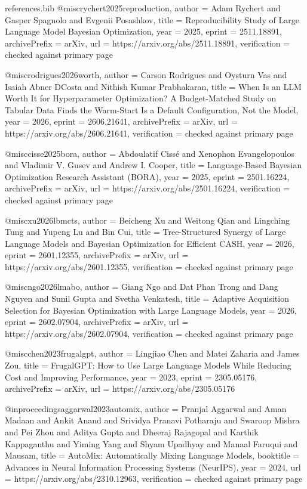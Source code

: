 \begin{filecontents*}[overwrite]{references.bib}
@misc{rychert2025reproduction,
  author = {Adam Rychert and Gasper Spagnolo and Evgenii Posashkov},
  title = {Reproducibility Study of Large Language Model {B}ayesian Optimization},
  year = {2025},
  eprint = {2511.18891},
  archivePrefix = {arXiv},
  url = {https://arxiv.org/abs/2511.18891},
  verification = {checked against primary page}
}

@misc{rodrigues2026worth,
  author = {Carson Rodrigues and Oysturn Vas and Isaiah Abner DCosta and Nithish Kumar Prabhakaran},
  title = {When Is an {LLM} Worth It for Hyperparameter Optimization? {A} Budget-Matched Study on Tabular Data Finds the Warm-Start Is a Default Configuration, Not the Model},
  year = {2026},
  eprint = {2606.21641},
  archivePrefix = {arXiv},
  url = {https://arxiv.org/abs/2606.21641},
  verification = {checked against primary page}
}

@misc{cisse2025bora,
  author = {Abdoulatif Ciss{\'e} and Xenophon Evangelopoulos and Vladimir V. Gusev and Andrew I. Cooper},
  title = {Language-Based {B}ayesian Optimization Research Assistant ({BORA})},
  year = {2025},
  eprint = {2501.16224},
  archivePrefix = {arXiv},
  url = {https://arxiv.org/abs/2501.16224},
  verification = {checked against primary page}
}

@misc{xu2026lbmcts,
  author = {Beicheng Xu and Weitong Qian and Lingching Tung and Yupeng Lu and Bin Cui},
  title = {Tree-Structured Synergy of Large Language Models and {B}ayesian Optimization for Efficient {CASH}},
  year = {2026},
  eprint = {2601.12355},
  archivePrefix = {arXiv},
  url = {https://arxiv.org/abs/2601.12355},
  verification = {checked against primary page}
}

@misc{ngo2026lmabo,
  author = {Giang Ngo and Dat Phan Trong and Dang Nguyen and Sunil Gupta and Svetha Venkatesh},
  title = {Adaptive Acquisition Selection for {B}ayesian Optimization with Large Language Models},
  year = {2026},
  eprint = {2602.07904},
  archivePrefix = {arXiv},
  url = {https://arxiv.org/abs/2602.07904},
  verification = {checked against primary page}
}

@misc{chen2023frugalgpt,
  author = {Lingjiao Chen and Matei Zaharia and James Zou},
  title = {{FrugalGPT}: How to Use Large Language Models While Reducing Cost and Improving Performance},
  year = {2023},
  eprint = {2305.05176},
  archivePrefix = {arXiv},
  url = {https://arxiv.org/abs/2305.05176}
}

@inproceedings{aggarwal2023automix,
  author = {Pranjal Aggarwal and Aman Madaan and Ankit Anand and Srividya Pranavi Potharaju and Swaroop Mishra and Pei Zhou and Aditya Gupta and Dheeraj Rajagopal and Karthik Kappaganthu and Yiming Yang and Shyam Upadhyay and Manaal Faruqui and Mausam},
  title = {{AutoMix}: Automatically Mixing Language Models},
  booktitle = {Advances in Neural Information Processing Systems (NeurIPS)},
  year = {2024},
  url = {https://arxiv.org/abs/2310.12963},
  verification = {checked against primary page}
}


\end{filecontents*}
